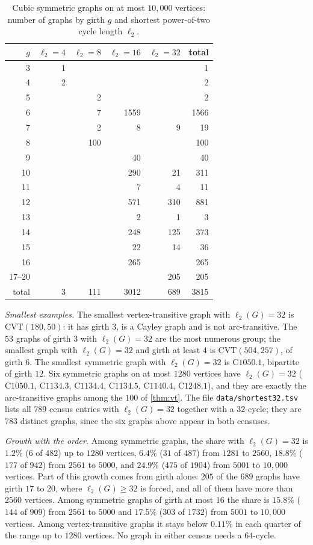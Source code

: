 \documentclass[11pt]{amsart}
\theoremstyle{remark}
\newcommand{\code}[1]{\texttt{#1}}
\newcommand{\sv}{\ell_2}
\begin{document}
\begin{table}[ht]
\centering
\caption{Cubic symmetric graphs on at most $10{,}000$ vertices: number of
graphs by girth $g$ and shortest power-of-two cycle length $\sv$.}
\label{tab:sym}
\begin{tabular}{@{}rrrrrr@{}}
\toprule
$g$ & $\sv=4$ & $\sv=8$ & $\sv=16$ & $\sv=32$ & total\\
\midrule
3 & 1 & & & & 1\\
4 & 2 & & & & 2\\
5 & & 2 & & & 2\\
6 & & 7 & 1559 & & 1566\\
7 & & 2 & 8 & 9 & 19\\
8 & & 100 & & & 100\\
9 & & & 40 & & 40\\
10 & & & 290 & 21 & 311\\
11 & & & 7 & 4 & 11\\
12 & & & 571 & 310 & 881\\
13 & & & 2 & 1 & 3\\
14 & & & 248 & 125 & 373\\
15 & & & 22 & 14 & 36\\
16 & & & 265 & & 265\\
17--20 & & & & 205 & 205\\
\addlinespace
total & 3 & 111 & 3012 & 689 & 3815\\
\bottomrule
\end{tabular}
\end{table}

\emph{Smallest examples.} The smallest vertex-transitive graph with $\sv(G)=32$
is $\mathrm{CVT}(180,50)$: it has girth $3$, is a Cayley graph and is not
arc-transitive. The $53$ graphs of girth $3$ with $\sv(G)=32$ are the most
numerous group; the smallest graph with $\sv(G)=32$ and girth at least $4$ is
$\mathrm{CVT}(504,257)$, of girth $6$. The smallest symmetric graph with
$\sv(G)=32$ is $\mathrm{C1050.1}$, bipartite of girth $12$. Six symmetric graphs
on at most $1280$ vertices have $\sv(G)=32$ ($\mathrm{C1050.1}$,
$\mathrm{C1134.3}$, $\mathrm{C1134.4}$, $\mathrm{C1134.5}$, $\mathrm{C1140.4}$,
$\mathrm{C1248.1}$), and they are exactly the arc-transitive graphs among the
$100$ of \cref{thm:vt}. The file \code{data/shortest32.tsv} lists all $789$
census entries with $\sv(G)=32$ together with a $32$-cycle; they are $783$
distinct graphs, since the six graphs above appear in both censuses.

\emph{Growth with the order.} Among symmetric graphs, the share with
$\sv(G)=32$ is $1.2\%$ ($6$ of $482$) up to $1280$ vertices, $6.4\%$ ($31$ of
$487$) from $1281$ to $2560$, $18.8\%$ ($177$ of $942$) from $2561$ to $5000$,
and $24.9\%$ ($475$ of $1904$) from $5001$ to $10{,}000$ vertices. Part of
this growth comes from girth alone: $205$ of the $689$ graphs have girth $17$ to
$20$, where $\sv(G)\ge 32$ is forced, and all of them have more than $2560$
vertices. Among symmetric graphs of girth at most $16$ the share is $15.8\%$
($144$ of $909$) from $2561$ to $5000$ and $17.5\%$ ($303$ of $1732$) from $5001$
to $10{,}000$ vertices. Among
vertex-transitive graphs it stays below $0.11\%$ in each quarter of the range
up to $1280$ vertices. No graph in either census needs a $64$-cycle.
\end{document}
